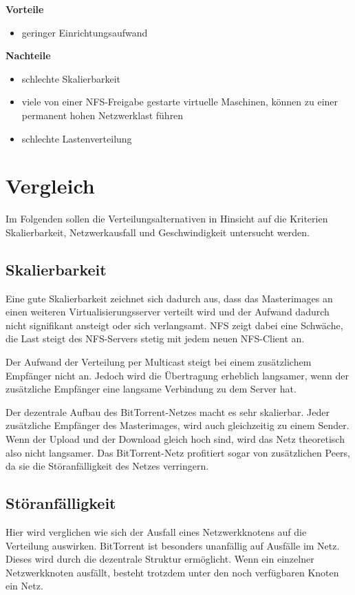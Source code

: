 
\textbf{Vorteile}
\begin{itemize}
 \item geringer Einrichtungsaufwand
\end{itemize}

\textbf{Nachteile}
\begin{itemize}
 \item schlechte Skalierbarkeit
 \item viele von einer NFS-Freigabe gestarte virtuelle Maschinen, können zu einer permanent hohen Netzwerklast führen
 \item schlechte Lastenverteilung
\end{itemize}

\section{Vergleich}
Im Folgenden sollen die Verteilungsalternativen in Hinsicht auf die Kriterien Skalierbarkeit, Netzwerkausfall und Geschwindigkeit untersucht werden.

\subsection{Skalierbarkeit}
Eine gute Skalierbarkeit zeichnet sich dadurch aus, dass das Masterimages an einen weiteren Virtualisierungsserver verteilt wird und der Aufwand dadurch nicht signifikant ansteigt oder sich verlangsamt. NFS zeigt dabei eine Schwäche, die Last steigt des NFS-Servers stetig mit jedem neuen NFS-Client an. 

Der Aufwand der Verteilung per Multicast steigt bei einem zusätzlichem Empfänger nicht an. Jedoch wird die Übertragung erheblich langsamer, wenn der zusätzliche Empfänger eine langsame Verbindung zu dem Server hat. 

Der dezentrale Aufbau des BitTorrent-Netzes macht es sehr skalierbar. Jeder zusätzliche Empfänger des Masterimages, wird auch gleichzeitig zu einem Sender. Wenn der Upload und der Download gleich hoch sind, wird das Netz theoretisch also nicht langsamer. Das BitTorrent-Netz profitiert sogar von zusätzlichen Peers, da sie die Störanfälligkeit des Netzes verringern.

\subsection{Störanfälligkeit}
Hier wird verglichen wie sich der Ausfall eines Netzwerkknotens auf die Verteilung auswirken. BitTorrent ist besonders unanfällig auf Ausfälle im Netz. Dieses wird durch die dezentrale Struktur ermöglicht. Wenn ein einzelner Netzwerkknoten ausfällt, besteht trotzdem unter den noch verfügbaren Knoten ein Netz. 

